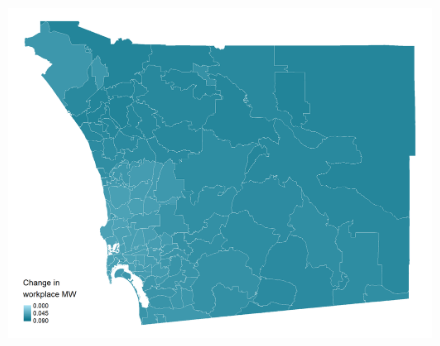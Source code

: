 \documentclass[aspectratio=169, t]{beamer}
\begin{document}
\begin{frame}[label = san_diego_example]
\begin{columns}
\begin{column}{0.50\textwidth}
\begin{figure}
                \includegraphics[scale = 0.3]{maps_events/output/san_diego2018-12_wkp_mw.png}
            \end{figure}   
        \end{column}
    \end{columns}
     \hyperlink{chi_example}{}
\end{frame}
\end{document}
